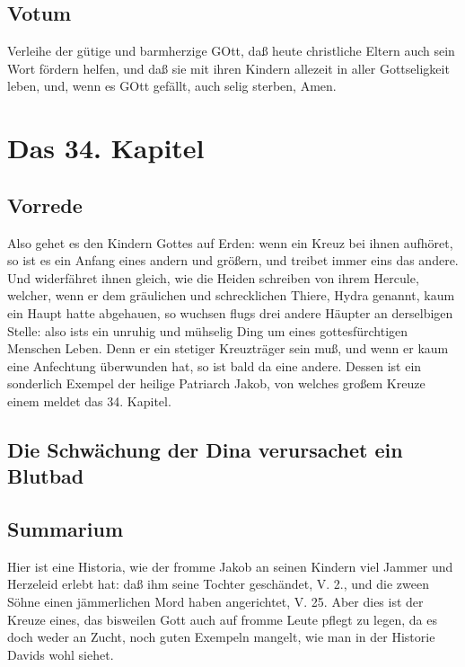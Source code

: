 \section{Votum}

Verleihe der gütige und barmherzige GOtt, daß heute christliche Eltern auch sein Wort fördern helfen, und daß sie mit ihren Kindern allezeit in aller Gottseligkeit leben, und, wenn es GOtt gefällt, auch selig sterben, Amen.

\chapter{Das 34. Kapitel}

\section{Vorrede}

Also gehet es den Kindern Gottes auf Erden: wenn ein Kreuz bei ihnen aufhöret, so ist es ein Anfang eines andern und größern, und treibet immer eins das andere. Und widerfähret ihnen gleich, wie die Heiden schreiben von ihrem Hercule, welcher, wenn er dem gräulichen und schrecklichen Thiere, Hydra genannt, kaum ein Haupt hatte abgehauen, so wuchsen flugs drei andere Häupter an derselbigen Stelle: also ists ein unruhig und mühselig Ding um eines gottesfürchtigen Menschen Leben. Denn er ein stetiger Kreuzträger sein muß, und wenn er kaum eine Anfechtung überwunden hat, so ist bald da eine andere. Dessen ist ein sonderlich Exempel der heilige Patriarch Jakob, von welches großem Kreuze einem meldet das 34. Kapitel.

\section{Die Schwächung der Dina verursachet ein Blutbad}

\section{Summarium}

Hier ist eine Historia, wie der fromme Jakob an seinen Kindern viel Jammer und Herzeleid erlebt hat: daß ihm seine Tochter geschändet, V. 2., und die zween Söhne einen jämmerlichen Mord haben angerichtet, V. 25. Aber dies ist der Kreuze eines, das bisweilen Gott auch auf fromme Leute pflegt zu legen, da es doch weder an Zucht, noch guten Exempeln mangelt, wie man in der Historie Davids wohl siehet.

